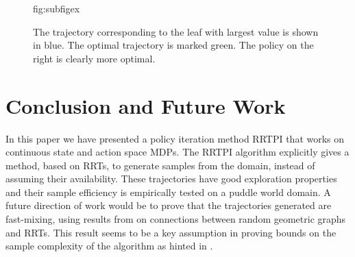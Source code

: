 \documentclass[wcp]{jmlr}
\begin{document}
\begin{figure}[htbp]
\floatconts
  {fig:subfigex}
  {\caption{The trajectory corresponding to the leaf with largest value is shown in blue. The optimal trajectory is marked green. The policy on the right is clearly more optimal.}}
  {%
    \qquad
  }
\end{figure}

\section{Conclusion and Future Work}
In this paper we have presented a policy iteration method RRTPI that works on continuous state and action space MDPs. The RRTPI algorithm explicitly gives a method, based on RRTs, to generate samples from the domain, instead of assuming their availability. These trajectories have good exploration properties and their sample efficiency is empirically tested on a puddle world domain. A future direction of work would be to prove that the trajectories generated are fast-mixing, using results from \citep{karaman} on connections between random geometric graphs and RRTs. This result seems to be a key assumption in proving bounds on the sample complexity of the algorithm as hinted in \citep{antosml}.  


\end{document}

